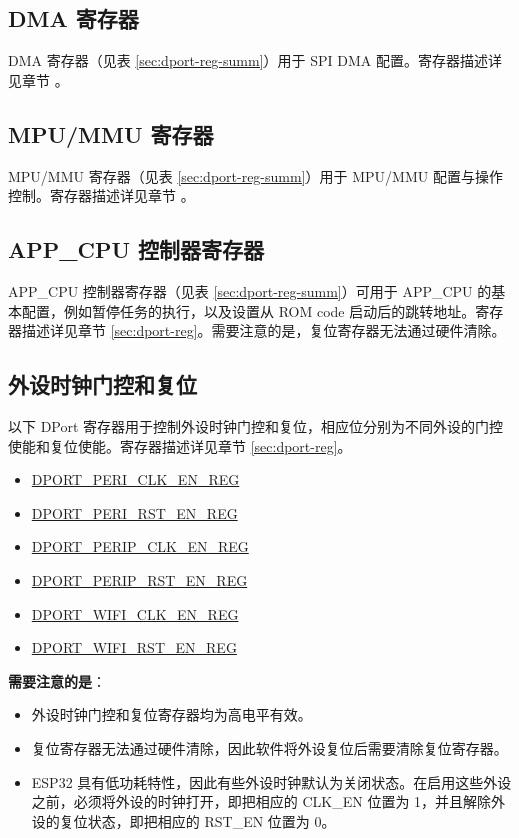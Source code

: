 \documentclass[main\_\_CN.tex]{subfiles}
\begin{document}
\subsection{DMA 寄存器}
DMA 寄存器（见表 \ref{sec:dport-reg-summ}）用于 SPI DMA 配置。寄存器描述详见章节 \textit{}。


\subsection{MPU/MMU 寄存器}
MPU/MMU 寄存器（见表 \ref{sec:dport-reg-summ}）用于 MPU/MMU 配置与操作控制。寄存器描述详见章节 \textit{}。


\subsection{APP\_CPU 控制器寄存器}
APP\_CPU 控制器寄存器（见表 \ref{sec:dport-reg-summ}）可用于 APP\_CPU 的基本配置，例如暂停任务的执行，以及设置从 ROM code 启动后的跳转地址。寄存器描述详见章节 \ref{sec:dport-reg}。需要注意的是，复位寄存器无法通过硬件清除。


\subsection{外设时钟门控和复位}\label{sec:peri-clock-gating-reset}

以下 DPort 寄存器用于控制外设时钟门控和复位，相应位分别为不同外设的门控使能和复位使能。寄存器描述详见章节 \ref{sec:dport-reg}。

\begin{itemize}
    \item \hyperref[regdesc:PERICLKENREG]{DPORT\_PERI\_CLK\_EN\_REG}
    \item \hyperref[regdesc:PERIRSTENREG]{DPORT\_PERI\_RST\_EN\_REG}
    \item \hyperref[regdesc:PERIPCLKENREG]{DPORT\_PERIP\_CLK\_EN\_REG}
    \item \hyperref[regdesc:PERIPRSTENREG]{DPORT\_PERIP\_RST\_EN\_REG}
    \item \hyperref[regdesc:WIFICLKENREG]{DPORT\_WIFI\_CLK\_EN\_REG}
    \item \hyperref[regdesc:WIFIRSTENREG]{DPORT\_WIFI\_RST\_EN\_REG}
\end{itemize}

\textbf{需要注意的是}：
\begin{itemize}
    \item 外设时钟门控和复位寄存器均为高电平有效。
    \item 复位寄存器无法通过硬件清除，因此软件将外设复位后需要清除复位寄存器。
    \item ESP32 具有低功耗特性，因此有些外设时钟默认为关闭状态。在启用这些外设之前，必须将外设的时钟打开，即把相应的 CLK\_EN 位置为 1，并且解除外设的复位状态，即把相应的 RST\_EN 位置为 0。

\end{itemize}

\hypertarget{dportreg-reg-summ}{}




\end{document}

